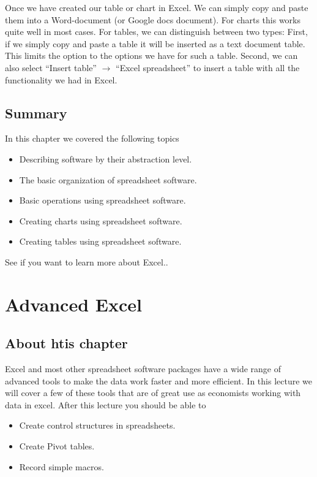 \documentclass[]{book}
\providecommand{\tightlist}{%
  \setlength{\itemsep}{0pt}\setlength{\parskip}{0pt}}
\begin{document}
Once we have created our table or chart in Excel. We can simply copy and paste them into a Word-document (or Google docs document). For charts this works quite well in most cases. For tables, we can distinguish between two types: First, if we simply copy and paste a table it will be inserted as a text document table. This limits the option to the options we have for such a table. Second, we can also select ``Insert table'' \(\rightarrow\) ``Excel spreadsheet'' to insert a table with all the functionality we had in Excel.

\hypertarget{summary-12}{%
\section{Summary}\label{summary-12}}

In this chapter we covered the following topics

\begin{itemize}
\tightlist
\item
  Describing software by their abstraction level.
\item
  The basic organization of spreadsheet software.
\item
  Basic operations using spreadsheet software.
\item
  Creating charts using spreadsheet software.
\item
  Creating tables using spreadsheet software.
\end{itemize}

See \citep{bible} if you want to learn more about Excel..

\hypertarget{advanced-excel}{%
\chapter{Advanced Excel}\label{advanced-excel}}

\hypertarget{about-htis-chapter}{%
\section{About htis chapter}\label{about-htis-chapter}}

Excel and most other spreadsheet software packages have a wide range of advanced tools to make the data work faster and more efficient. In this lecture we will cover a few of these tools that are of great use as economists working with data in excel. After this lecture you should be able to

\begin{itemize}
\tightlist
\item
  Create control structures in spreadsheets.
\item
  Create Pivot tables.
\item
  Record simple macros.
\end{itemize}
\end{document}
